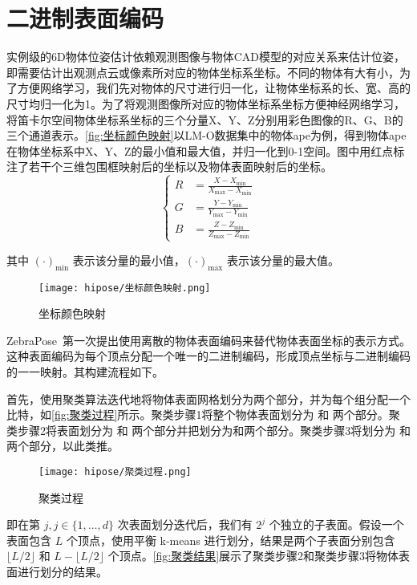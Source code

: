 \section{二进制表面编码}
实例级的6D物体位姿估计依赖观测图像与物体CAD模型的对应关系来估计位姿，即需要估计出观测点云或像素所对应的物体坐标系坐标。不同的物体有大有小，为了方便网络学习，我们先对物体的尺寸进行归一化，让物体坐标系的长、宽、高的尺寸均归一化为1。为了将观测图像所对应的物体坐标系坐标方便神经网络学习，将笛卡尔空间物体坐标系坐标的三个分量X、Y、Z分别用彩色图像的R、G、B的三个通道表示。\autoref{fig:坐标颜色映射}以LM-O数据集中的物体ape为例，得到物体ape在物体坐标系中X、Y、Z的最小值和最大值，并归一化到0-1空间。图中用红点标注了若干个三维包围框映射后的坐标以及物体表面映射后的坐标。
\begin{equation}
    \left\{
    \begin{aligned}
        R &= \frac{X - X_{\min}}{X_{\max} - X_{\min}} \\
        G &= \frac{Y - Y_{\min}}{Y_{\max} - Y_{\min}} \\
        B &= \frac{Z - Z_{\min}}{Z_{\max} - Z_{\min}}
    \end{aligned}
    \right.
\end{equation}

其中 $(\cdot)_{\min}$ 表示该分量的最小值，$(\cdot)_{\max}$ 表示该分量的最大值。
\begin{figure}[ht]
    \centering
    \texttt{[image: hipose/坐标颜色映射.png]}
    \caption{坐标颜色映射}
    \label{fig:坐标颜色映射}
\end{figure}

ZebraPose~\cite{su2022zebrapose}第一次提出使用离散的物体表面编码来替代物体表面坐标的表示方式。这种表面编码为每个顶点分配一个唯一的二进制编码，形成顶点坐标与二进制编码的一一映射。其构建流程如下。

首先，使用聚类算法迭代地将物体表面网格划分为两个部分，并为每个组分配一个比特，如\autoref{fig:聚类过程}所示。聚类步骤1将整个物体表面划分为  和 两个部分。聚类步骤2将表面划分为 和 两个部分并把划分为和两个部分。聚类步骤3将划分为  和 两个部分，以此类推。

\begin{figure}[ht]
    \centering
    \texttt{[image: hipose/聚类过程.png]}
    \caption{聚类过程}
    \label{fig:聚类过程}
\end{figure}

即在第 $j, j \in \{1, \ldots, d\}$ 次表面划分迭代后，我们有 $2^{j}$ 个独立的子表面。假设一个表面包含 $L$ 个顶点，使用平衡 k-means 进行划分，结果是两个子表面分别包含 $\lfloor L/2 \rfloor$ 和 $L-\lfloor L/2 \rfloor$ 个顶点。\autoref{fig:聚类结果}展示了聚类步骤2和聚类步骤3将物体表面进行划分的结果。

